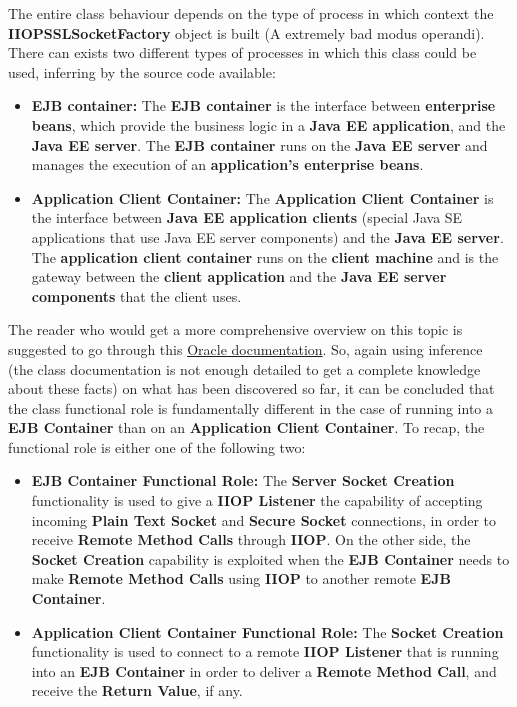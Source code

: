 \documentclass{../common/latex_classes/pdf_presentation}
\begin{document}
		\begin{frame}
			The entire class behaviour depends on the type of process in which context the \textbf{IIOPSSLSocketFactory} object is built (A extremely bad modus operandi).
			There can exists two different types of processes in which this class could be used, inferring by the source code available:
			\begin{itemize}
				\item \textbf{EJB container:}
				The \textbf{EJB container} is the interface between \textbf{enterprise beans}, which provide the business logic in a \textbf{Java EE application}, and the \textbf{Java EE server}. The \textbf{EJB container} runs on the \textbf{Java EE server} and manages the execution of an \textbf{application's enterprise beans}.
				\item \textbf{Application Client Container:}
				The \textbf{Application Client Container} is the interface between \textbf{Java EE application clients} (special Java SE applications that use Java EE server components) and the \textbf{Java EE server}. The \textbf{application client container} runs on the \textbf{client machine} and is the gateway between the \textbf{client application} and the \textbf{Java EE server components} that the client uses.
			\end{itemize}
			
			The reader who would get a more comprehensive overview on this topic is suggested to go through this \href{https://docs.oracle.com/javaee/7/firstcup/java-ee002.htm}{Oracle documentation}.
			So, again using inference (the class documentation is not enough detailed to get a complete knowledge about these facts) on what has been discovered so far, it can be concluded that the class functional role is fundamentally different in the case of running into a \textbf{EJB Container} than on an \textbf{Application Client Container}.
			To recap, the functional role is either one of the following two:
			\begin{itemize}
				\item \textbf{EJB Container Functional Role:}
				The \textbf{Server Socket Creation} functionality is used to give a \textbf{IIOP Listener} the capability of accepting incoming \textbf{Plain Text Socket} and \textbf{Secure Socket} connections, in order to receive \textbf{Remote Method Calls} through \textbf{IIOP}.
				On the other side, the \textbf{Socket Creation} capability is exploited when the \textbf{EJB Container} needs to make \textbf{Remote Method Calls} using \textbf{IIOP} to another remote \textbf{EJB Container}.
				\item \textbf{Application Client Container Functional Role:}
				The \textbf{Socket Creation} functionality is used to connect to a remote \textbf{IIOP Listener} that is running into an \textbf{EJB Container} in order to deliver a \textbf{Remote Method Call}, and receive the \textbf{Return Value}, if any.
			\end{itemize}
		\end{frame}
	
\end{document}
